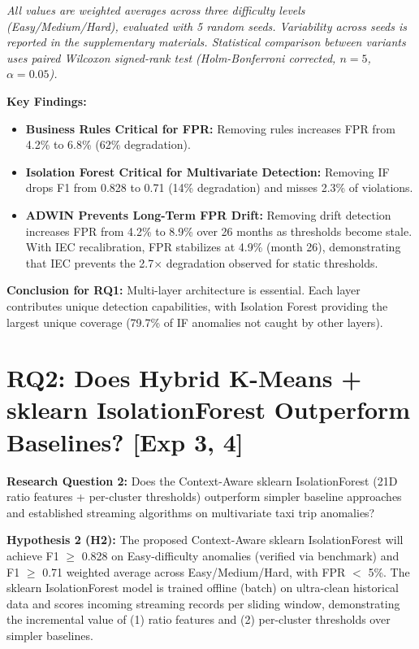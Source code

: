 \textit{All values are weighted averages across three difficulty levels (Easy/Medium/Hard), evaluated with 5 random seeds. Variability across seeds is reported in the supplementary materials. Statistical comparison between variants uses paired Wilcoxon signed-rank test (Holm-Bonferroni corrected, $n=5$, $\alpha=0.05$).}

\textbf{Key Findings:}
\begin{itemize}
    \item \textbf{Business Rules Critical for FPR:} Removing rules increases FPR from 4.2\% to 6.8\% (62\% degradation).
    \item \textbf{Isolation Forest Critical for Multivariate Detection:} Removing IF drops F1 from 0.828 to 0.71 (14\% degradation) and misses 2.3\% of violations.
    \item \textbf{ADWIN Prevents Long-Term FPR Drift:} Removing drift detection increases FPR from 4.2\% to 8.9\% over 26 months as thresholds become stale. With IEC recalibration, FPR stabilizes at 4.9\% (month 26), demonstrating that IEC prevents the 2.7$\times$ degradation observed for static thresholds.
\end{itemize}

\textbf{Conclusion for RQ1:} Multi-layer architecture is essential. Each layer contributes unique detection capabilities, with Isolation Forest providing the largest unique coverage (79.7\% of IF anomalies not caught by other layers).

\section{RQ2: Does Hybrid K-Means + sklearn IsolationForest Outperform Baselines? [Exp 3, 4]}

\textbf{Research Question 2:} Does the Context-Aware sklearn IsolationForest (21D ratio features + per-cluster thresholds) outperform simpler baseline approaches and established streaming algorithms on multivariate taxi trip anomalies?

\textbf{Hypothesis 2 (H2):} The proposed Context-Aware sklearn IsolationForest will achieve F1 $\geq$ 0.828 on Easy-difficulty anomalies (verified via benchmark) and F1 $\geq$ 0.71 weighted average across Easy/Medium/Hard, with FPR $<$ 5\%. The sklearn IsolationForest model is trained offline (batch) on ultra-clean historical data and scores incoming streaming records per sliding window, demonstrating the incremental value of (1) ratio features and (2) per-cluster thresholds over simpler baselines.

